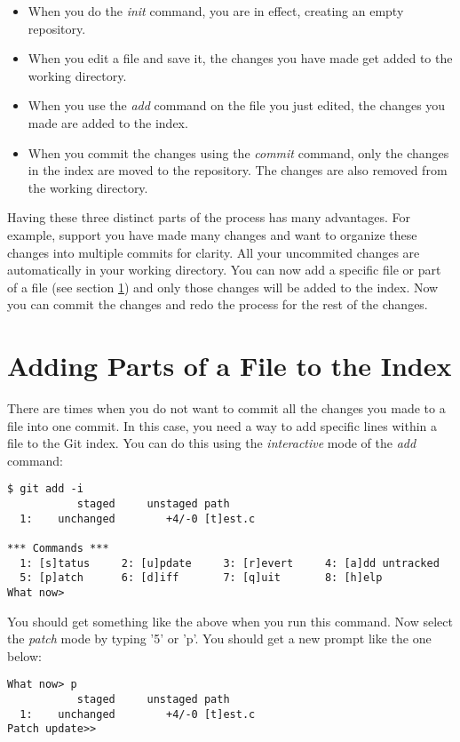 \begin{itemize}
\item When you do the \emph{init} command, you are in effect, creating an
empty repository.
\item When you edit a file and save it, the changes you have made get 
added to the working directory.
\item When you use the \emph{add} command on the file you just edited, 
the changes you made are added to the index.
\item When you commit the changes using the \emph{commit} command, only
the changes in the index are moved to the repository. The changes are
also removed from the working directory.
\end{itemize}

Having these three distinct parts of the process has many advantages. For
example, support you have made many changes and want to organize these changes
into multiple commits for clarity. All your uncommited changes are automatically
in your working directory. You can now add a specific file or part of a 
file (see section \ref{sec:add-i}) and only those changes will be added to the
index. Now you can commit the changes and redo the process for the rest
of the changes.

\section{Adding Parts of a File to the Index}
\label{sec:add-i}
There are times when you do not want to commit all the changes you
made to a file into one commit. In this case, you need a way to add
specific lines within a file to the Git index. You can do this using
the \emph{interactive} mode of the \emph{add} command:

\begin{lstlisting}[label=git-add-i, caption='Adding parts of files to a git repository']
$ git add -i
           staged     unstaged path
  1:    unchanged        +4/-0 [t]est.c

*** Commands ***
  1: [s]tatus     2: [u]pdate     3: [r]evert     4: [a]dd untracked
  5: [p]atch      6: [d]iff       7: [q]uit       8: [h]elp
What now>
\end{lstlisting}

You should get something like the above when you run this command. Now
select the \emph{patch} mode by typing '5' or 'p'. You should get a new
prompt like the one below:

\begin{lstlisting}[label=git-add-i, caption='Adding parts of files to a git repository']
What now> p
           staged     unstaged path
  1:    unchanged        +4/-0 [t]est.c
Patch update>> 
\end{lstlisting}

